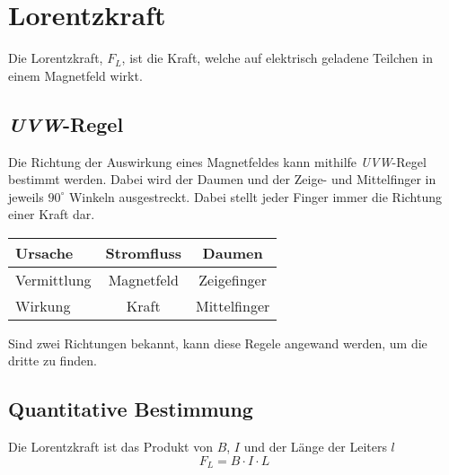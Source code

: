 \documentclass{article}
\begin{document}
 
\section{Lorentzkraft}
Die Lorentzkraft, $F_L$, ist die Kraft, welche auf elektrisch geladene Teilchen in einem Magnetfeld wirkt. 
\subsection{\emph{UVW}-Regel} 
Die Richtung der Auswirkung eines Magnetfeldes kann mithilfe \emph{UVW}-Regel bestimmt werden. Dabei wird der Daumen und der Zeige- und Mittelfinger in jeweils $90^\circ$ Winkeln ausgestreckt. Dabei stellt jeder Finger immer die Richtung einer Kraft dar.
\begin{center}
\begin{tabular}{ |l|c|c| }
\hline
 \colorbox{red!30}{U}rsache & Stromfluss & Daumen \\
\hline
 \colorbox{red!30}{V}ermittlung & Magnetfeld & Zeigefinger \\
\hline
 \colorbox{red!30}{W}irkung & Kraft & Mittelfinger \\
\hline
\end{tabular}
\end{center}
Sind zwei Richtungen bekannt, kann diese Regele angewand werden, um die dritte zu finden.
 
\subsection{Quantitative Bestimmung}
Die Lorentzkraft ist das Produkt von $B$, $I$ und der Länge der Leiters $l$ 
\[
 F_L = B \cdot I \cdot L 
\] 
 
\end{document}
